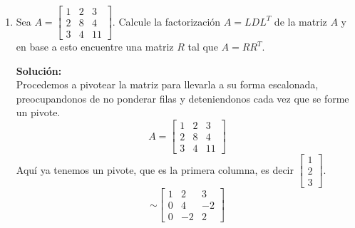 \documentclass[12pt]{article}
\newenvironment{solucion}
{\begin{mdframed}[backgroundcolor=black!10]
		{\bf Solución:}\\
	}
	{
	\end{mdframed}
}
\newenvironment{preguntas}
{\begin{enumerate}\itemsep12pt
	}
	{
	\end{enumerate}
}
\begin{document}
\begin{preguntas}
\begin{solucion}
		Procedamos a construir $L$. Lo que haremos será dividir cada vector seleccionado anteriormente por el coeficiente que está más arriba (pivote) y usar cada vector resultante como una columna de $L$. De esta manera,
		$$ L = \begin{bmatrix}
		1 & 0 & 0 & 0 \\
		-2 & 1 & 0 & 0 \\
		1 & -3 & 1 & 0 \\
		-3 & 4 & 2 & 1
		\end{bmatrix}$$
		Finalmente,
		$$A = \begin{bmatrix}
		1 & 0 & 0 & 0 \\
		-2 & 1 & 0 & 0 \\
		1 & -3 & 1 & 0 \\
		-3 & 4 & 2 & 1
		\end{bmatrix} \begin{bmatrix}
		2 & 4 & -1 & 5 & -2 \\
		0 & 3 & 1 & 2 & -3 \\
		0 & 0 & 0 & 2 & 1 \\
		0 & 0 & 0 & 0 & 5
		\end{bmatrix}$$
\end{solucion}
\item Sea $A = \begin{bmatrix}
	1 & 2 & 3\\
	2 & 8 & 4 \\
	3 & 4 & 11\end{bmatrix}$. Calcule la factorización $A=LDL^T$ de la matriz $A$ y en base a esto encuentre una matriz $R$ tal que $A = RR^T$.
\begin{solucion}
Procedemos a pivotear la matriz para llevarla a su forma escalonada, preocupandonos de no ponderar filas y deteniendonos cada vez que se forme un pivote.
		$$A = \begin{bmatrix}
		1 & 2 & 3\\
		2 & 8 & 4 \\
		3 & 4 & 11\end{bmatrix}$$
		Aquí ya tenemos un pivote, que es la primera columna, es decir $\begin{bmatrix} 1 \\ 2 \\ 3 \end{bmatrix}$.
		$$\sim \begin{bmatrix}
		1 & 2 & 3\\
		0 & 4 & -2 \\
		0 & -2 & 2\end{bmatrix}$$

\end{solucion}
\end{preguntas}
\end{document}
